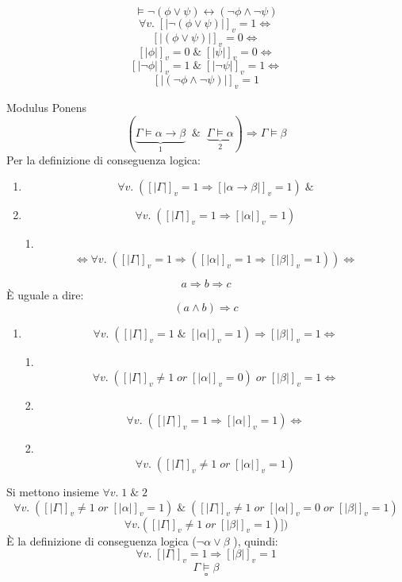 \documentclass{article}
\theoremstyle{break}
\theoremstyle{break}
\theoremstyle{break}
\theoremstyle{break}
\begin{document}
\begin{figure}[H]
    \begin{exercise}
        \[
            \models \neg (\phi \vee \psi) \leftrightarrow (\neg \phi \wedge \neg \psi)
        \] 
        \[
            \forall v.\; [|\neg (\phi \vee \psi)|]_v=1 \Leftrightarrow
        \] 
        \[
            [|(\phi \vee \psi)|]_v=0 \Leftrightarrow
        \] 
        \[
            [|\phi|]_v=0\; \&\; [|\psi|]_v=0 \Leftrightarrow
        \] 
        \[
            [|\neg \phi|]_v=1 \; \&\; [|\neg \psi|]_v=1 \Leftrightarrow
        \] 
        \[
            [|(\neg \phi \wedge \neg \psi)|]_v=1
        \] 
    \end{exercise}
\end{figure}
\begin{exercise}
    Modulus Ponens
    \[
        (\underbrace{\Gamma \models \alpha \to \beta}_{1}\;\;\&\;\; \underbrace{\Gamma \models \alpha}_{2}) \Rightarrow \Gamma \models \beta
    \] 
    Per la definizione di conseguenza logica:
    \begin{enumerate}
        \item \[
                \forall v.\; ([|\Gamma|]_v=1 \Rightarrow [|\alpha \to \beta|]_v=1) \;\&
        \] 
        \item \[
                \forall v.\; ([|\Gamma|]_v=1 \Rightarrow [|\alpha|]_v=1)
        \] 
    \item[1.] \[
            \Leftrightarrow \forall v.\; ([|\Gamma|]_v=1 \Rightarrow ([|\alpha|]_v=1 \Rightarrow [|\beta|]_v=1)) \Leftrightarrow
    \] 
    \end{enumerate}
    \begin{define}
        \[
        a \Rightarrow b \Rightarrow c
        \] 
        È uguale a dire:
        \[
            (a \wedge b) \Rightarrow c
        \] 
    \end{define}
    \begin{enumerate}
        \item 
        \[
            \forall v.\; ([|\Gamma|]_v=1\;\&\;[|\alpha|]_v=1) \Rightarrow [|\beta|]_v=1 \Leftrightarrow
        \] 
    \item[1.]\[
            \forall v.\; ([|\Gamma|]_v \neq 1\; or\; [|\alpha|]_v=0)\; or\; [|\beta|]_v=1 \Leftrightarrow
    \] 
\item[2.]\[
        \forall v.\; ([|\Gamma|]_v=1 \Rightarrow [|\alpha|]_v = 1) \Leftrightarrow
\]
\item[2.]
\[
   \forall v.\; ([|\Gamma|]_v \neq 1\; or\; [|\alpha|]_v=1)  
\] 
    \end{enumerate}
    Si mettono insieme \(\forall v.\; 1\; \&\; 2 \) 
    \[
        \forall v.\; ([|\Gamma|]_v \neq 1\; or\; [|\alpha|]_v=1)\; \&\; ([|\Gamma|]_v \neq 1\; or\; [|\alpha|]_v=0\; or\; [|\beta|]_v=1)
    \] 
    \[
        \forall v.([|\Gamma|]_v \neq 1\; or\; [|\beta|]_v=1)])
    \]
    È la definizione di conseguenza logica (\( \neg \alpha \vee \beta \) ), quindi:
    \[
        \forall v. \;[|\Gamma|]_v=1 \Rightarrow [|\beta|]_v=1
    \] 
    \[
    \Gamma \models \beta
    \] 
    \[
    \square
    \]  
\end{exercise}
\end{document}
